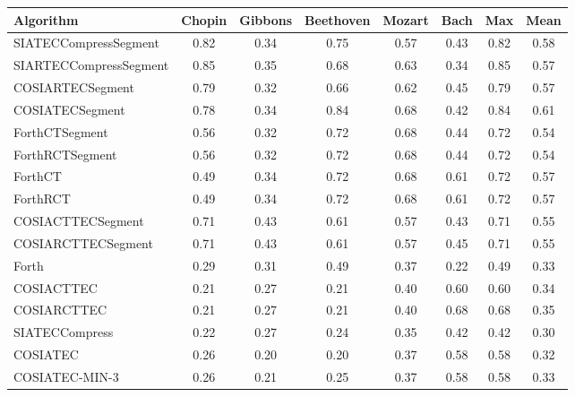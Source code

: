 \documentclass{article}
\begin{document}
\begin{table}
\centering
\begin{tabular}{lccccccc}\hline
Algorithm& Chopin&Gibbons& Beethoven& Mozart& Bach& Max& Mean\\\hline
SIATECCompressSegment&0.82&0.34&0.75&0.57&0.43&0.82&0.58\\
SIARTECCompressSegment&0.85&0.35&0.68&0.63&0.34&0.85&0.57\\
COSIARTECSegment&0.79&0.32&0.66&0.62&0.45&0.79&0.57\\
COSIATECSegment&0.78&0.34&0.84&0.68&0.42&0.84&0.61\\
ForthCTSegment&0.56&0.32&0.72&0.68&0.44&0.72&0.54\\
ForthRCTSegment&0.56&0.32&0.72&0.68&0.44&0.72&0.54\\
ForthCT&0.49&0.34&0.72&0.68&0.61&0.72&0.57\\
ForthRCT&0.49&0.34&0.72&0.68&0.61&0.72&0.57\\
COSIACTTECSegment&0.71&0.43&0.61&0.57&0.43&0.71&0.55\\
COSIARCTTECSegment&0.71&0.43&0.61&0.57&0.45&0.71&0.55\\
Forth&0.29&0.31&0.49&0.37&0.22&0.49&0.33\\
COSIACTTEC&0.21&0.27&0.21&0.40&0.60&0.60&0.34\\
COSIARCTTEC&0.21&0.27&0.21&0.40&0.68&0.68&0.35\\
SIATECCompress&0.22&0.27&0.24&0.35&0.42&0.42&0.30\\
COSIATEC&0.26&0.20&0.20&0.37&0.58&0.58&0.32\\
COSIATEC-MIN-3&0.26&0.21&0.25&0.37&0.58&0.58&0.33\\
\hline
\end{tabular}
\end{table}
\end{document}
